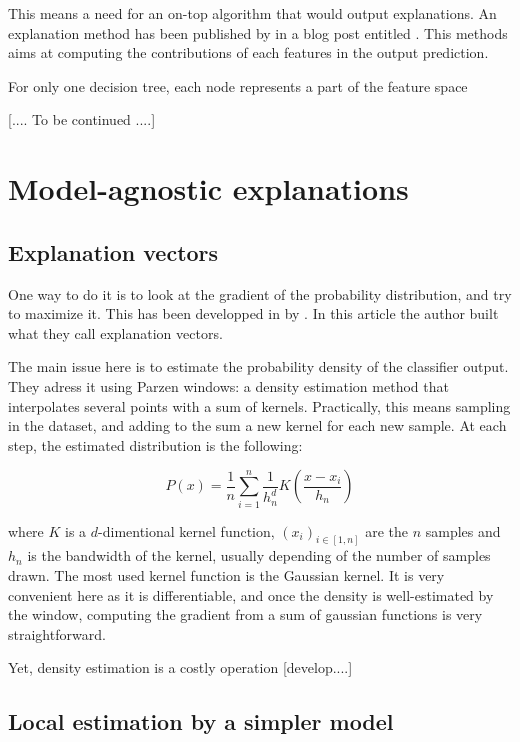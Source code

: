 \documentclass[a4paper,11pt]{kth-mag}
\begin{document}
This means a need for an on-top algorithm that would output explanations. An explanation method has been published by \citeauthor{treeinterpreter} in a blog post entitled . This methods aims at computing the contributions of each features in the output prediction.

For only one decision tree, each node represents a part of the feature space


[.... To be continued ....]

\section{Model-agnostic explanations}

\subsection{Explanation vectors}

One way to do it is to look at the gradient of the probability distribution, and try to maximize it. This has been developped in  by \citeauthor{explvect}. In this article the author built what they call explanation vectors.

The main issue here is to estimate the probability density of the classifier output. They adress it using Parzen windows: a density estimation method that interpolates several points with a sum of kernels. Practically, this means sampling in the dataset, and adding to the sum a new kernel for each new sample. At each step, the estimated distribution is the following:

\[
	P(x) = \frac{1}{n} \sum_{i=1}^n \frac1{h_n^d} K \left( \frac{x - x_i}{h_n} \right)
\]

where $K$ is a $d$-dimentional kernel function, $(x_i)_{i \in [1,n]}$ are the $n$ samples and $h_n$ is the bandwidth of the kernel, usually depending of the number of samples drawn. The most used kernel function is the Gaussian kernel. It is very convenient here as it is differentiable, and once the density is well-estimated by the window, computing the gradient from a sum of gaussian functions is very straightforward.

Yet, density estimation is a costly operation [develop....]

\subsection{Local estimation by a simpler model}
\end{document}
